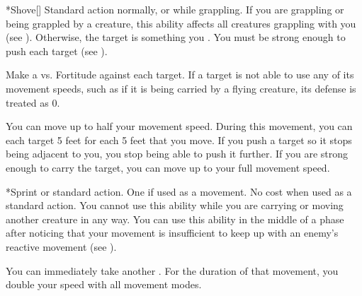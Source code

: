     \begin{activeability}*{Shove}[]
      \abilityusagetime Standard action normally, or  while grappling.
      \rankline
      If you are grappling or being grappled by a creature, this ability affects all creatures grappling with you (see ).
      Otherwise, the target is something you .
      You must be strong enough to push each target (see ).

      Make a  vs. Fortitude against each target.
      If a target is not able to use any of its movement speeds, such as if it is being carried by a flying creature, its defense is treated as 0.

      \hit You can move up to half your movement speed.
      During this movement, you can  each target 5 feet for each 5 feet that you move.
      If you push a target so it stops being adjacent to you, you stop being able to push it further.
      \crit If you are strong enough to carry the target, you can move up to your full movement speed.
    \end{activeability}

    \begin{activeability}*{Sprint}
      \abilityusagetime {} or standard action.
      \abilitycost One  if used as a movement. No cost when used as a standard action.
      \rankline
      You cannot use this ability while you are carrying or moving another creature in any way.
      You can use this ability in the middle of a phase after noticing that your movement is insufficient to keep up with an enemy's reactive movement (see ).

      You can immediately take another .
      For the duration of that movement, you double your speed with all movement modes.
    \end{activeability}


